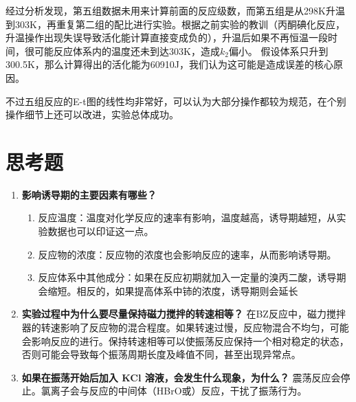 \documentclass[12pt,hyperref,a4paper,UTF8]{ctexart}
\begin{document}
	经过分析发现，第五组数据未用来计算前面的反应级数，而第五组是从298K升温到303K，再重复第二组的配比进行实验。根据之前实验的教训（丙酮碘化反应，升温操作出现失误导致活化能计算直接变成负的），升温后如果不再恒温一段时间，很可能反应体系内的温度还未到达303K，造成$k_2$偏小。
	假设体系只升到300.5K，那么计算得出的活化能为60910J，我们认为这可能是造成误差的核心原因。

	不过五组反应的E-t图的线性均非常好，可以认为大部分操作都较为规范，在个别操作细节上还可以改进，实验总体成功。
\section{思考题}
\begin{enumerate}
	\item \textbf{影响诱导期的主要因素有哪些？}
	\begin{enumerate}
		\item 反应温度：温度对化学反应的速率有影响，温度越高，诱导期越短，从实验数据也可以印证这一点。
		\item 反应物的浓度：反应物的浓度也会影响反应的速率，从而影响诱导期。
		\item 反应体系中其他成分：如果在反应初期就加入一定量的溴丙二酸，诱导期会缩短。相反的，如果提高体系中铈的浓度，诱导期则会延长
	\end{enumerate}
	
	
	\item \textbf{实验过程中为什么要尽量保持磁力搅拌的转速相等？}
	在BZ反应中，磁力搅拌器的转速影响了反应物的混合程度。如果转速过慢，反应物混合不均匀，可能会影响反应的进行。保持转速相等可以使振荡反应保持一个相对稳定的状态，否则可能会导致每个振荡周期长度及峰值不同，甚至出现异常点。
	
	
	\item \textbf{如果在振荡开始后加入 KCl 溶液，会发生什么现象，为什么？}
	震荡反应会停止。氯离子会与反应的中间体（HBrO或）反应，干扰了振荡行为。
	
\end{enumerate}
\end{document}
